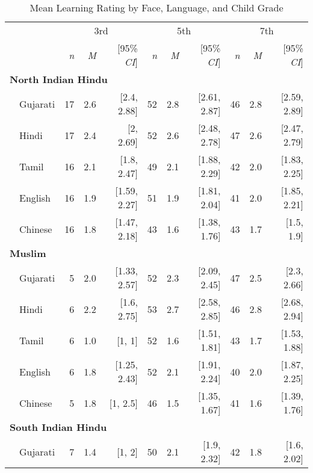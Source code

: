\begin{table}[t]
\centering
\caption{Mean Learning Rating by Face, Language, and Child Grade}
\begin{footnotesize}
\label{tab:face-learning-means}
\begin{tabular}{p{.1in}lrrrrrrrrr}
\toprule
 &  & \multicolumn{3}{c}{3rd} & \multicolumn{3}{c}{5th} & \multicolumn{3}{c}{7th} \\
\cline{3-5} \cline{6-8} \cline{9-11}
&  & \textit{n} & \textit{M} & [95\% \textit{CI}] &  \textit{n} & \textit{M} & [95\% \textit{CI}] &  \textit{n}  & \textit{M} & [95\% \textit{CI}]\\
\midrule
\multicolumn{11}{l}{\textbf{North Indian Hindu}}\\
 & Gujarati & 17 & 2.6 & [2.4, 2.88] & 52 & 2.8 & [2.61, 2.87] & 46 & 2.8 & [2.59, 2.89]\\

 & Hindi & 17 & 2.4 & [2, 2.69] & 52 & 2.6 & [2.48, 2.78] & 47 & 2.6 & [2.47, 2.79]\\

& Tamil & 16 & 2.1 & [1.8, 2.47] & 49 & 2.1 & [1.88, 2.29] & 42 & 2.0 & [1.83, 2.25]\\

 & English & 16 & 1.9 & [1.59, 2.27] & 51 & 1.9 & [1.81, 2.04] & 41 & 2.0 & [1.85, 2.21]\\

& Chinese & 16 & 1.8 & [1.47, 2.18] & 43 & 1.6 & [1.38, 1.76] & 43 & 1.7 & [1.5, 1.9]\\

\midrule
\multicolumn{11}{l}{\textbf{Muslim}}\\
& Gujarati & 5 & 2.0 & [1.33, 2.57] & 52 & 2.3 & [2.09, 2.45] & 47 & 2.5 & [2.3, 2.66]\\

 & Hindi & 6 & 2.2 & [1.6, 2.75] & 53 & 2.7 & [2.58, 2.85] & 46 & 2.8 & [2.68, 2.94]\\

& Tamil & 6 & 1.0 & [1, 1] & 52 & 1.6 & [1.51, 1.81] & 43 & 1.7 & [1.53, 1.88]\\

 & English & 6 & 1.8 & [1.25, 2.43] & 52 & 2.1 & [1.91, 2.24] & 40 & 2.0 & [1.87, 2.25]\\
 & Chinese & 5 & 1.8 & [1, 2.5] & 46 & 1.5 & [1.35, 1.67] & 41 & 1.6 & [1.39, 1.76]\\

\midrule
\multicolumn{11}{l}{\textbf{South Indian Hindu}}\\
 & Gujarati & 7 & 1.4 & [1, 2] & 50 & 2.1 & [1.9, 2.32] & 42 & 1.8 & [1.6, 2.02]\\


\end{tabular}
\end{footnotesize}
\end{table}

